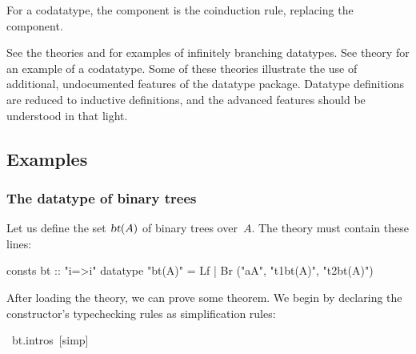 For a codatatype, the component  is the coinduction rule,
replacing the  component.

See the theories  and  for examples of
infinitely branching datatypes.  See theory  for an example
of a codatatype.  Some of these theories illustrate the use of additional,
undocumented features of the datatype package.  Datatype definitions are
reduced to inductive definitions, and the advanced features should be
understood in that light.


\subsection{Examples}

\subsubsection{The datatype of binary trees}

Let us define the set $\emph{\sl bt}(A)$ of binary trees over~$A$.  The theory
must contain these lines:
\begin{alltt*}\isastyleminor
consts   bt :: "i=>i"
datatype "bt(A)" = Lf | Br ("a\isasymin{}A", "t1\isasymin{}bt(A)", "t2\isasymin{}bt(A)")
\end{alltt*}
After loading the theory, we can prove some theorem.  
We begin by declaring the constructor's typechecking rules
as simplification rules:
\begin{isabelle}
\ bt.intros\ [simp]%
\end{isabelle}

